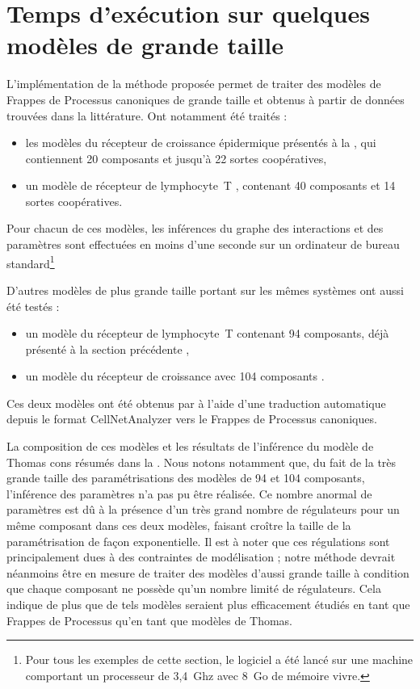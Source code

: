 \section{Temps d'exécution sur quelques modèles de grande taille}

L'implémentation de la méthode proposée \storef permet de traiter des modèles de
Frappes de Processus canoniques de grande taille et obtenus à partir de données
trouvées dans la littérature.
Ont notamment été traités :
\begin{itemize}
  \item les modèles du récepteur de croissance épidermique présentés
    à la  \cite{Sahin09},
    qui contiennent 20 composants et jusqu'à 22 sortes coopératives,
  \item un modèle de récepteur de lymphocyte~T \cite{Klamt06},
    contenant 40 composants et 14 sortes coopératives.
\end{itemize}
Pour chacun de ces modèles, les inférences du graphe des interactions et des paramètres
sont effectuées en moins d'une seconde sur un ordinateur de bureau
standard\footnote{Pour tous les exemples de cette section,
le logiciel a été lancé sur une machine comportant
un processeur de 3,4~Ghz avec 8~Go de mémoire vivre.}

D'autres modèles de plus grande taille portant sur les mêmes systèmes ont aussi été testés :
\begin{itemize}
  \item un modèle du récepteur de lymphocyte~T contenant 94 composants,
    déjà présenté à la section précédente \cite{SaezRodriguez2007},
  \item un modèle du récepteur de croissance avec 104 composants \cite{Samaga2009}.
\end{itemize}
Ces deux modèles ont été obtenus par  à l'aide d'une traduction
automatique depuis le format CellNetAnalyzer \cite{klamt2007structural}
vers le Frappes de Processus canoniques.

La composition de ces modèles et les résultats de l'inférence du modèle de Thomas
cons résumés dans la .
Nous notons notamment que, du fait de la très grande taille des paramétrisations
des modèles de 94 et 104 composants, l'inférence des paramètres n'a pas pu être réalisée.
Ce nombre anormal de paramètres est dû à la présence d'un très grand nombre de régulateurs
pour un même composant dans ces deux modèles, faisant croître la taille de la paramétrisation
de façon exponentielle.
Il est à noter que ces régulations sont principalement dues à des contraintes de modélisation ;
notre méthode devrait néanmoins être en mesure de traiter des modèles d'aussi grande taille
à condition que chaque composant ne possède qu'un nombre limité de régulateurs.
Cela indique de plus que de tels modèles seraient plus efficacement étudiés
en tant que Frappes de Processus qu'en tant que modèles de Thomas.

